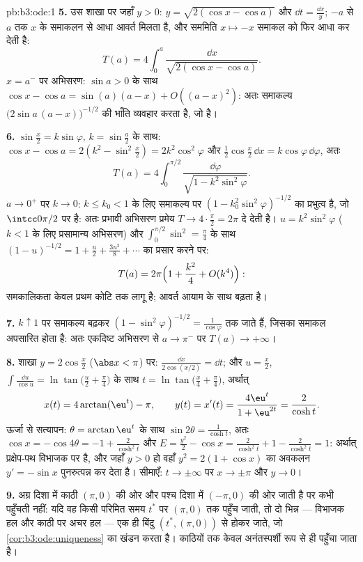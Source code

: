 \begin{solution}{pb:b3:ode:1}
\textbf{5.} उस शाखा पर जहाँ $y > 0$: $y = \sqrt{2(\cos x
- \cos a)}$ और $\dd t = \frac{\dd x}{y}$; $-a$ से $a$
तक $x$ के समाकलन से आधा आवर्त मिलता है, और सममिति $x
\mapsto -x$ समाकल को
फिर आधा कर देती है:
\[
T(a) = 4\int_0^a\frac{\dd x}{\sqrt{2(\cos x - \cos a)}} .
\]
$x = a^-$ पर अभिसरण: $\sin a > 0$ के साथ $\cos x - \cos a = \sin(a)(a - x) +
O((a-x)^2)$: अतः समाकल्य $\bigl(2\sin a\,(a - x)\bigr)^{-1/2}$ की भाँति व्यवहार
करता है, जो  है।

\textbf{6.} $\sin\frac x2 = k\sin\varphi$, $k =
\sin\frac a2$ के साथ: $\cos x - \cos a = 2(k^2 - \sin^2\frac x2)
= 2k^2\cos^2\varphi$ और $\frac12\cos\frac x2\,\dd x =
k\cos\varphi\,\dd\varphi$, अतः
\[
T(a) = 4\int_0^{\pi/2}
\frac{\dd\varphi}{\sqrt{1 - k^2\sin^2\varphi}} .
\]
$a \to 0^+$ पर $k \to 0$: $k \leq k_0 < 1$ के लिए समाकल्य पर $(1 - k_0^2\sin^2\varphi)^{-1/2}$ का प्रभुत्व है, जो
$\intcc0{\pi/2}$ पर  है: अतः प्रभावी अभिसरण प्रमेय $T \to
4\cdot\frac\pi2 = 2\pi$ दे देती है। $u =
k^2\sin^2\varphi$
($k < 1$ के लिए प्रसामान्य अभिसरण) और $\int_0^{\pi/2}\sin^2 = \frac\pi4$ के साथ $(1 - u)^{-1/2} = 1 +
\frac u2 + \frac{3u^2}8 + \cdots$ का प्रसार करने
पर:
\[
T(a) = 2\pi\Bigl(1 + \frac{k^2}{4} + O(k^4)\Bigr) :
\]
समकालिकता केवल प्रथम कोटि तक लागू है; आवर्त आयाम के साथ बढ़ता है।

\textbf{7.} $k \uparrow 1$ पर समाकल्य बढ़कर $(1
- \sin^2\varphi)^{-1/2} = \frac1{\cos\varphi}$ तक जाते हैं, जिसका समाकल
अपसारित होता है: अतः एकदिष्ट अभिसरण से $a \to \pi^-$ पर $T(a) \to
+\infty$।

\textbf{8.} शाखा $y = 2\cos\frac x2$ ($\abs x <
\pi$) पर: $\frac{\dd x}{2\cos(x/2)} = \dd t$; और $u = \frac
x2$, $\int\frac{\dd u}{\cos u} =
\ln\tan\bigl(\frac u2 + \frac\pi4\bigr)$ के साथ
$t =
\ln\tan\bigl(\frac x4 + \frac\pi4\bigr)$, अर्थात्
\[
x(t) = 4\arctan(\eu^t) - \pi,
\qquad y(t) = x'(t) = \frac{4\eu^t}{1 + \eu^{2t}} =
\frac{2}{\cosh t} .
\]
ऊर्जा से सत्यापन: $\theta = \arctan\eu^t$ के साथ $\sin2\theta = \frac1{\cosh t}$, अतः $\cos x = -\cos4\theta =
-1 + \frac{2}{\cosh^2t}$ और $E = \frac{y^2}2 - \cos x =
\frac2{\cosh^2t} + 1 - \frac2{\cosh^2t} = 1$: अर्थात्
प्रक्षेप-पथ विभाजक पर है, और जहाँ $y > 0$ हो वहाँ $y^2 = 2(1 +
\cos x)$ का अवकलन $y' = -\sin x$
पुनरुत्पन्न कर देता है। सीमाएँ: $t \to \pm\infty$ पर $x
\to \pm\pi$ और $y \to 0$।

\textbf{9.}  अग्र दिशा में काठी $(\pi, 0)$ की ओर और पश्च दिशा में
$(-\pi, 0)$ की ओर जाती है पर कभी पहुँचती नहीं: यदि वह किसी परिमित समय
$t^*$ पर $(\pi, 0)$ तक पहुँच जाती, तो दो भिन्न  --- विभाजक हल
और काठी पर अचर हल --- एक ही बिंदु $(t^*, (\pi, 0))$ से होकर जाते, जो \cref{cor:b3:ode:uniqueness} का
खंडन करता है। काठियों तक केवल अनंतस्पर्शी रूप से ही पहुँचा जाता है।


\end{solution}
